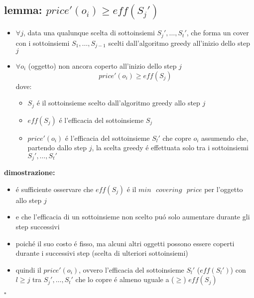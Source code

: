 \subsection*{lemma: $price'(o_i)\geq eff(S_j')$}
\begin{flushleft}
	\begin{itemize}
		\item $\forall j$, data una qualunque scelta di sottoinsiemi $S_j',\ldots,S_t'$, che forma un cover con i sottoinsiemi $S_1,\ldots,S_{j-1}$ scelti dall'algoritmo greedy all'inizio dello step $j$
		\item $\forall o_i$ (oggetto) non ancora coperto all'inizio dello step $j$
			$$price'(o_i)\geq eff(S_j)$$
		dove:
		\begin{itemize}
			\item $S_j$ \'e il sottoinsieme scelto dall'algoritmo greedy allo step $j$
			\item $eff(S_j)$ \'e l'efficacia del sottoinsieme $S_j$
			\item $price'(o_i)$ \'e l'efficacia del sottoinsieme $S_l'$ che copre $o_i$ assumendo che, partendo dallo step $j$, la scelta greedy \'e effettuata solo tra i sottoinsiemi $S_j',\ldots,S_t'$
		\end{itemize}
	\end{itemize}
	\textbf{dimostrazione:}
	\begin{itemize}
		\item \'e sufficiente osservare che $eff(S_j)$ \'e il $min\text{ }covering\text{ }price$ per l'oggetto allo step $j$ 
		\item e che l'efficacia di un sottoinsieme non scelto pu\'o solo aumentare durante gli step successivi
		\item poich\'e il suo costo \'e fisso, ma alcuni altri oggetti possono essere coperti durante i successivi step (scelta di ulteriori sottoinsiemi)
		\item quindi il $price'(o_i)$, ovvero l'efficacia del sottoinsieme $S_l'$ ($eff(S_l')$) con $l\geq j$ tra $S_j',\ldots,S_t'$ che lo copre \'e almeno uguale a ($\geq$) $eff(S_j)$
	\end{itemize}
	\hfill$\square$
\end{flushleft}


